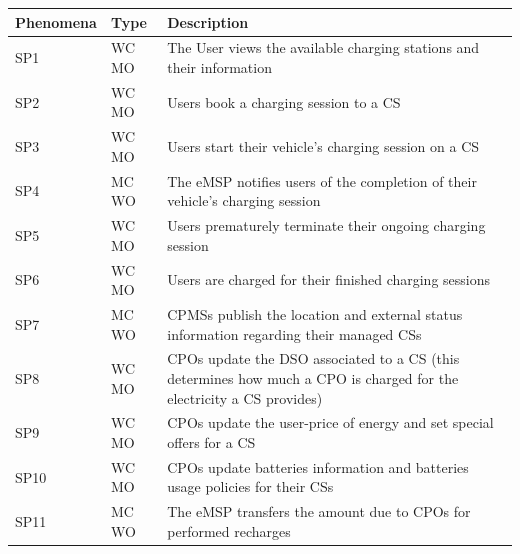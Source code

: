 \documentclass[11pt]{article}
\begin{document}
\begin{table}[H]
    \centering
    \setlength{\tabcolsep}{18pt}
    \renewcommand{\arraystretch}{1.2}
    \begin{tabularx}{\textwidth}{|>{\centering\hsize=0.3\hsize}X|>{\centering\hsize=0.3\hsize}X|>{\hsize=1.4\hsize}X|}
        \hline
        \textbf{Phenomena} & \textbf{Type} & \textbf{Description} \\
        \hline
        SP1 & WC MO & The User views the available charging stations and their information \\
        \hline
        SP2 & WC MO & Users book a charging session to a CS \\
        \hline
        SP3 & WC MO & Users start their vehicle's charging session on a CS \\
        \hline
        SP4 & MC WO & The eMSP notifies users of the completion of their vehicle's charging session \\
        \hline
        SP5 & WC MO & Users prematurely terminate their ongoing charging session \\
        \hline
        SP6 & WC MO & Users are charged for their finished charging sessions \\
        \hline
        SP7 & MC WO & CPMSs publish the location and external status information regarding their managed CSs \\
        \hline
        SP8 & WC MO & CPOs update the DSO associated to a CS (this determines how much a CPO is charged for the electricity a CS provides) \\
        \hline
        SP9 & WC MO & CPOs update the user-price of energy and set special offers for a CS \\
        \hline
        SP10 & WC MO & CPOs update batteries information and batteries usage policies for their CSs \\
        \hline
        SP11 & MC WO & The eMSP transfers the amount due to CPOs for performed recharges \\
        \hline
    \end{tabularx}
    \label{tab:shared_phenomena}
\end{table}
\end{document}

